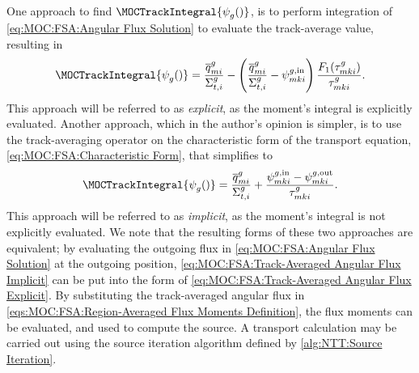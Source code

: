 {{{            One approach to find $\MOCTrackIntegral{\aflux[][g][]}$, is to perform integration of \cref{eq:MOC:FSA:Angular Flux Solution} to evaluate the track-average value, resulting in
            \begin{equation}\label{eq:MOC:FSA:Track-Averaged Angular Flux Explicit}
                \MOCTrackIntegral{\aflux[][g][]} = \frac{\tsrcF[mi]}{\xst} - \left(\frac{\tsrcF[mi]}{\xst} - \afluxin\right)\frac{F_1(\segopt)}{\segopt}.
            \end{equation}
            This approach will be referred to as \emph{explicit}, as the moment's integral is explicitly evaluated.
            Another approach, which in the author's opinion is simpler, is to use the track-averaging operator on the characteristic form of the transport equation, \cref{eq:MOC:FSA:Characteristic Form}, that simplifies to
            \begin{equation}\label{eq:MOC:FSA:Track-Averaged Angular Flux Implicit}
                \MOCTrackIntegral{\aflux[][g][]} = \frac{\tsrcF[mi]}{\xst} + \frac{\afluxin-\afluxout}{\segopt}.
            \end{equation}
            This approach will be referred to as \emph{implicit}, as the moment's integral is not explicitly evaluated.
            We note that the resulting forms of these two approaches are equivalent; by evaluating the outgoing flux in \cref{eq:MOC:FSA:Angular Flux Solution} at the outgoing position, \cref{eq:MOC:FSA:Track-Averaged Angular Flux Implicit} can be put into the form of \cref{eq:MOC:FSA:Track-Averaged Angular Flux Explicit}.
            By substituting the track-averaged angular flux in \cref{eqs:MOC:FSA:Region-Averaged Flux Moments Definition}, the flux moments can be evaluated, and used to compute the source.
            A transport calculation may be carried out using the source iteration algorithm defined by \cref{alg:NTT:Source Iteration}.
        }
}}
